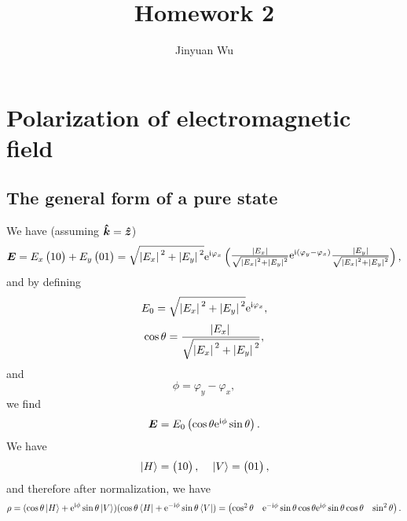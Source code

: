 \documentclass[hyperref, a4paper]{article}
\title{Homework 2}
\author{Jinyuan Wu}
\newcommand*{\ii}{\mathrm{i}}
\newcommand*{\ee}{\mathrm{e}}
\def\\{}%
\begin{document}
\maketitle

\section{Polarization of electromagnetic field}

\subsection{The general form of a pure state}

We have  (assuming $\vu*{k} = \vu*{z}$)
\[
    \vb*{E} = E_x \pmqty{1 \\ 0} + E_y \pmqty{0 \\ 1}
    = \sqrt{\abs*{E_x}^2 + \abs*{E_y}^2} \ee^{\ii \varphi_x}
    \pmqty{
        \frac{\abs*{E_x}}{\sqrt{\abs*{E_x}^2 + \abs*{E_y}^2}} \\
        \ee^{\ii (\varphi_y - \varphi_x)} \frac{\abs*{E_y}}{\sqrt{\abs*{E_x}^2 + \abs*{E_y}^2}}
    }, 
\]
and by defining 
\begin{equation}
    E_0 = \sqrt{\abs*{E_x}^2 + \abs*{E_y}^2} \ee^{\ii \varphi_x}, 
\end{equation}
\begin{equation}
    \cos \theta = \frac{\abs*{E_x}}{\sqrt{\abs*{E_x}^2 + \abs*{E_y}^2}} ,
\end{equation}
and 
\begin{equation}
    \phi = \varphi_ y - \varphi_x, 
\end{equation}
we find 
\begin{equation}
    \vb*{E} = E_0 \pmqty{\cos \theta \\ \ee^{\ii \phi} \sin \theta}.
\end{equation}
We have 
\begin{equation}
    \ket*{H} = \pmqty{1 \\ 0}, \quad 
    \ket*{V} = \pmqty{0 \\ 1},
\end{equation}
and therefore after normalization, we have 
\begin{equation}
    \rho = (\cos \theta \ket*{H} + \ee^{\ii \phi} \sin \theta \ket*{V})
    (\cos \theta \bra*{H} + \ee^{- \ii \phi} \sin \theta \bra*{V})
    = \pmqty{
        \cos^2 \theta & \ee^{- \ii \phi} \sin \theta \cos \theta \\
        \ee^{\ii \phi} \sin \theta \cos \theta & \sin^2 \theta
    }.
\end{equation}
\end{document}
